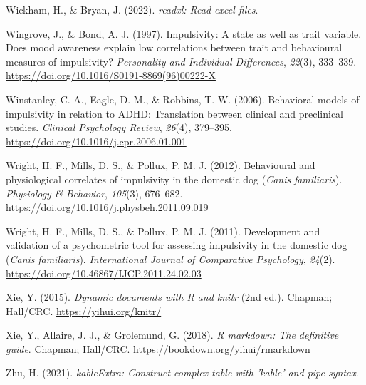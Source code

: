 \documentclass[
  ,pub,floatsintext]{apa6}
\newlength{\cslhangindent}
\newlength{\cslentryspacingunit} %
\newenvironment{CSLReferences}[2] %
 {%
  \setlength{\parindent}{0pt}
  \ifodd #1
  \let\oldpar\par
  \def\par{\hangindent=\cslhangindent\oldpar}
  \fi
  \setlength{\parskip}{#2\cslentryspacingunit}
 }%
 {}
\begin{document}
\begin{CSLReferences}{1}{0}
\leavevmode{}%
Wickham, H., \& Bryan, J. (2022). \emph{{readxl}: Read excel files}.

\leavevmode{}%
Wingrove, J., \& Bond, A. J. (1997). Impulsivity: {A} state as well as trait variable. {Does} mood awareness explain low correlations between trait and behavioural measures of impulsivity? \emph{Personality and Individual Differences}, \emph{22}(3), 333--339. \url{https://doi.org/10.1016/S0191-8869(96)00222-X}

\leavevmode{}%
Winstanley, C. A., Eagle, D. M., \& Robbins, T. W. (2006). Behavioral models of impulsivity in relation to {ADHD}: Translation between clinical and preclinical studies. \emph{Clinical Psychology Review}, \emph{26}(4), 379--395. \url{https://doi.org/10.1016/j.cpr.2006.01.001}

\leavevmode{}%
Wright, H. F., Mills, D. S., \& Pollux, P. M. J. (2012). Behavioural and physiological correlates of impulsivity in the domestic dog ({\emph{Canis}}{ \emph{familiaris}}). \emph{Physiology \& Behavior}, \emph{105}(3), 676--682. \url{https://doi.org/10.1016/j.physbeh.2011.09.019}

\leavevmode{}%
Wright, H. F., Mills, D. S., \& Pollux, P. M. J. (2011). Development and validation of a psychometric tool for assessing impulsivity in the domestic dog ({\emph{Canis}}{ \emph{familiaris}}). \emph{International Journal of Comparative Psychology}, \emph{24}(2). \url{https://doi.org/10.46867/IJCP.2011.24.02.03}

\leavevmode{}%
Xie, Y. (2015). \emph{Dynamic documents with {R} and knitr} (2nd ed.). Chapman; Hall/CRC. \url{https://yihui.org/knitr/}

\leavevmode{}%
Xie, Y., Allaire, J. J., \& Grolemund, G. (2018). \emph{R markdown: The definitive guide}. Chapman; Hall/CRC. \url{https://bookdown.org/yihui/rmarkdown}

\leavevmode{}%
Zhu, H. (2021). \emph{kableExtra: Construct complex table with 'kable' and pipe syntax}.

\end{CSLReferences}
\end{document}
